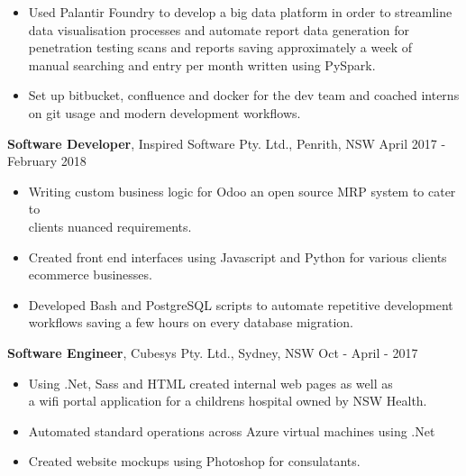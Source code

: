 \documentclass[margin]{res}
\begin{document}
\begin{resume}
\begin{itemize}
\item Used Palantir Foundry to develop a big data platform in order to streamline \\
	data visualisation processes and automate report data generation for \\
		penetration testing scans and reports saving approximately a week of \\
		manual searching and entry per month written using PySpark.

\item Set up bitbucket, confluence and docker for the dev team and coached interns \\
	on git usage and modern development workflows.
\end{itemize}

{\bf Software Developer}, 
	Inspired Software Pty. Ltd., Penrith, NSW \hfill April 2017 - February 2018
\begin{itemize} \itemsep 0pt  %
\item Writing custom business logic for Odoo an open source MRP system to cater to \\
	clients nuanced requirements.

\item  Created front end interfaces using Javascript and Python for various clients \\
	ecommerce businesses.

\item Developed Bash and PostgreSQL scripts to automate repetitive development \\
	workflows saving a few hours on every database migration.
\end{itemize}

 {\bf Software Engineer}, 
	Cubesys Pty. Ltd., Sydney, NSW \hfill Oct - April - 2017
 \begin{itemize} \itemsep 0pt  %
 \item Using .Net, Sass and HTML created internal web pages as well as \\
	 a wifi portal application for a childrens hospital owned by NSW Health.

 \item Automated standard operations across Azure virtual machines using .Net

 \item Created website mockups using Photoshop for consulatants.
 \end{itemize}


\end{resume}
\end{document}
